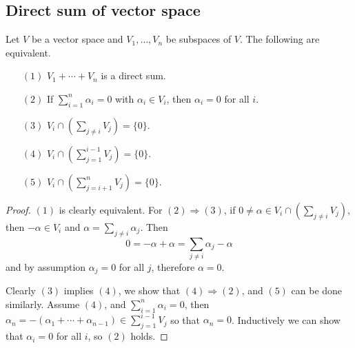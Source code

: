 \subsection{Direct sum of vector space}
\begin{proposition}
Let $V$ be a vector space and $V_1,\dots,V_n$ be subspaces of $V$. The following are equivalent.
\begin{itemize}
\item[$(1)$] $V_1+\cdots+V_n$ is a direct sum.
\item[$(2)$] If $\sum_{i=1}^{n}\alpha_i=0$ with $\alpha_i\in V_i$, then $\alpha_i=0$ for all $i$.
\item[$(3)$] $V_i\cap(\sum_{j\neq i}V_j)=\{0\}$.
\item[$(4)$] $V_i\cap(\sum_{j=1}^{i-1}V_j)=\{0\}$.
\item[$(5)$] $V_i\cap(\sum_{j=i+1}^{n}V_j)=\{0\}$.
\end{itemize}
\end{proposition}
\begin{proof}
$(1)$ is clearly equivalent. For $(2)\Rightarrow(3)$, if $0\neq\alpha\in V_i\cap(\sum_{j\neq i}V_j)$, then $-\alpha\in　V_i$ and $\alpha=\sum_{j\neq i}\alpha_j$. Then
\[0=-\alpha+\alpha=\sum_{j\neq i}\alpha_j-\alpha\]
and by assumption $\alpha_j=0$ for all $j$, therefore $\alpha=0$.\par
Clearly $(3)$ implies $(4)$, we show that $(4)\Rightarrow(2)$, and $(5)$ can be done similarly. Assume $(4)$, and $\sum_{i=1}^{n}\alpha_i=0$, then $\alpha_n=-(\alpha_1+\cdots+\alpha_{n-1})\in \sum_{j=1}^{i-1}V_j$ so that $\alpha_n=0$. Inductively we can show that $\alpha_i=0$ for all $i$, so $(2)$ holds.
\end{proof}